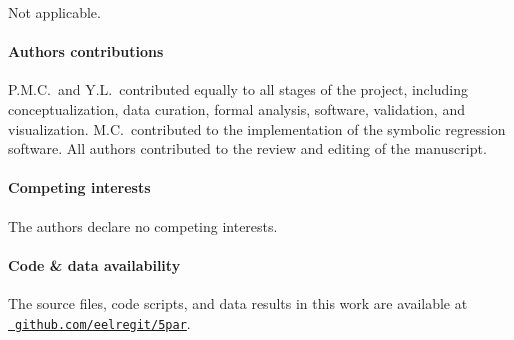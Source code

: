\documentclass[12pt, a4paper]{article}
\begin{document}
Not applicable.


\paragraph{\large Authors contributions}

P.M.C.\ and Y.L.\ contributed equally to all stages of the project,
including conceptualization, data curation, formal analysis, software,
validation, and visualization.
M.C.\ contributed to the implementation of the symbolic regression
software.
All authors contributed to the review and editing of the manuscript.


\paragraph{\large Competing interests}

The authors declare no competing interests.


\paragraph{\large Code \& data availability}

The source files, code scripts, and data results in this work are
available at \href{https://github.com/eelregit/5par}{\faGithub\
\texttt{github.com/eelregit/5par}}.




{\singlespacing

}
\end{document}
